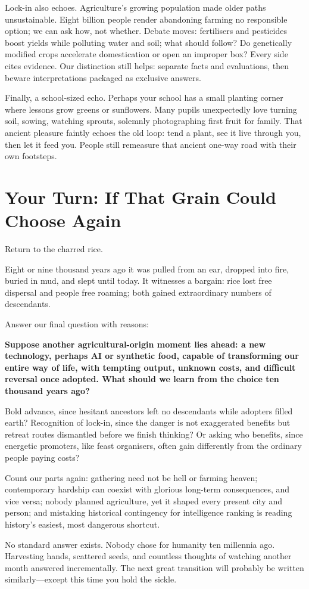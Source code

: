 Lock-in also echoes. Agriculture's growing population made older paths unsustainable. Eight billion people render abandoning farming no responsible option; we can ask how, not whether. Debate moves: fertilisers and pesticides boost yields while polluting water and soil; what should follow? Do genetically modified crops accelerate domestication or open an improper box? Every side cites evidence. Our distinction still helps: separate facts and evaluations, then beware interpretations packaged as exclusive answers.

Finally, a school-sized echo. Perhaps your school has a small planting corner where lessons grow greens or sunflowers. Many pupils unexpectedly love turning soil, sowing, watching sprouts, solemnly photographing first fruit for family. That ancient pleasure faintly echoes the old loop: tend a plant, see it live through you, then let it feed you. People still remeasure that ancient one-way road with their own footsteps.

\section[Your Turn: Let the Rice Choose Again]{Your Turn: If That Grain Could Choose Again}
Return to the charred rice.

Eight or nine thousand years ago it was pulled from an ear, dropped into fire, buried in mud, and slept until today. It witnesses a bargain: rice lost free dispersal and people free roaming; both gained extraordinary numbers of descendants.

Answer our final question with reasons:

\textbf{Suppose another agricultural-origin moment lies ahead: a new technology, perhaps AI or synthetic food, capable of transforming our entire way of life, with tempting output, unknown costs, and difficult reversal once adopted. What should we learn from the choice ten thousand years ago?}

Bold advance, since hesitant ancestors left no descendants while adopters filled earth? Recognition of lock-in, since the danger is not exaggerated benefits but retreat routes dismantled before we finish thinking? Or asking who benefits, since energetic promoters, like feast organisers, often gain differently from the ordinary people paying costs?

Count our parts again: gathering need not be hell or farming heaven; contemporary hardship can coexist with glorious long-term consequences, and vice versa; nobody planned agriculture, yet it shaped every present city and person; and mistaking historical contingency for intelligence ranking is reading history's easiest, most dangerous shortcut.

No standard answer exists. Nobody chose for humanity ten millennia ago. Harvesting hands, scattered seeds, and countless thoughts of watching another month answered incrementally. The next great transition will probably be written similarly---except this time you hold the sickle.
